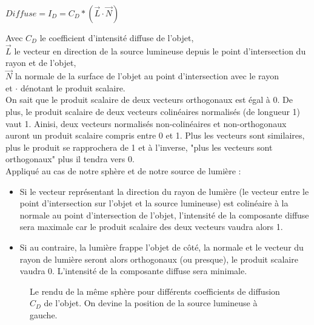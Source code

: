 \documentclass[11pt]{article}
\begin{document}
\begin{center}
	$Diffuse = I_D = C_D*(\overrightarrow{L}\cdot\overrightarrow{N})$
\end{center}
Avec $C_D$ le coefficient d'intensité diffuse de l'objet,\\
$\overrightarrow{L}$ le vecteur en direction de la source lumineuse depuis le point d'intersection du rayon et de l'objet,\\
$\overrightarrow{N}$ la normale de la surface de l'objet au point d'intersection avec le rayon\\
et $\cdot$ dénotant le produit scalaire.\\
On sait que le produit scalaire de deux vecteurs orthogonaux est égal à 0. De plus, le produit scalaire de deux vecteurs colinéaires normalisés (de longueur 1) vaut 1. Ainisi, deux vecteurs normalisés non-colinéaires et non-orthogonaux auront un produit scalaire compris entre 0 et 1. Plus les vecteurs sont similaires, plus le produit se rapprochera de 1 et à l'inverse, "plus les vecteurs sont orthogonaux" plus il tendra vers 0.\\
Appliqué au cas de notre sphère et de notre source de lumière :\\
\begin{itemize}
	\item{Si le vecteur représentant la direction du rayon de lumière (le vecteur entre le point d'intersection sur l'objet et la source lumineuse) est colinéaire à la normale au point d'intersection de l'objet, l'intensité de la composante diffuse sera maximale car le produit scalaire des deux vecteurs vaudra alors 1.}
	\item{Si au contraire, la lumière frappe l'objet de côté, la normale et le vecteur du rayon de lumière seront alors orthogonaux (ou presque), le produit scalaire vaudra 0. L'intensité de la composante diffuse sera minimale.}
\end{itemize}


\begin{figure}[h!]

	\caption{Le rendu de la même sphère pour différents coefficients de diffusion $C_D$ de l'objet. On devine la position de la source lumineuse à gauche.}
	\label{differentDiffuse}
\end{figure}
\FloatBarrier
\end{document}
